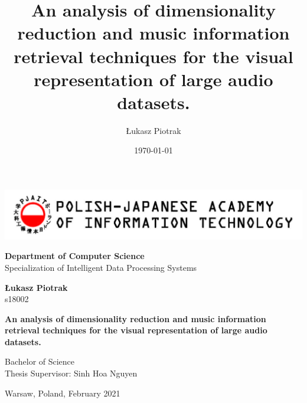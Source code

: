 \documentclass[a4paper, 12pt, twoside]{report}
\author{Łukasz Piotrak}
\date{\today}
\title{An analysis of dimensionality reduction and music information retrieval techniques for the visual representation of large audio datasets.}
\begin{document}
\begin{titlepage}

        \includegraphics[width=\textwidth]{./Figures/pjatk_logo.jpg}


    \begin{center}
        \vspace{1.5cm}

        \Large
        \textbf{Department of Computer Science} \\

        \normalsize
        Specialization of Intelligent Data Processing Systems \\

        \vfill

        \Large
        \textbf{Łukasz Piotrak} \\
        \small
        s18002

        \vfill

    \end{center}
        \Large
        \textbf{An analysis of dimensionality reduction and music information retrieval techniques for the visual representation of large audio datasets.}

        \vfill

    \begin{center}

        \large
        Bachelor of Science \\
        Thesis Supervisor: Sinh Hoa Nguyen \\

        \vfill

        \normalsize
        Warsaw, Poland, February 2021

    \end{center}
\end{titlepage}
\end{document}
